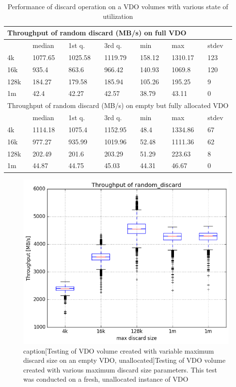 \documentclass[
  color, %
  table, %
  lof,   %
  lot,   %
]{fithesis3}
\begin{document}
\begin{table}
\centering
\begin{tabular}{|l|l|l|l|l|l|l|}
        \hline
        \multicolumn{7}{|l|}{Throughput of random discard (MB/s) on full VDO} \\ \hline
         & median & 1st q. & 3rd q. & min & max & stdev \\ \hline 
4k & 1077.65 & 1025.58 & 1119.79 & 158.12 & 1310.17 & 123 \\ \hline
16k & 935.4 & 863.6 & 966.42 & 140.93 & 1069.8 & 120 \\ \hline
128k & 184.27 & 179.58 & 185.94 & 105.26 & 195.25 & 9 \\ \hline
1m & 42.4 & 42.27 & 42.57 & 38.79 & 43.11 & 0 \\ \hline
\hline
        \multicolumn{7}{|l|}{Throughput of random discard (MB/s) on empty but fully allocated VDO} \\ \hline
        & median & 1st q. & 3rd q. & min & max & stdev \\ \hline 
4k & 1114.18 & 1075.4 & 1152.95 & 48.4 & 1334.86 & 67 \\ \hline
16k & 977.27 & 935.99 & 1019.96 & 52.48 & 1111.36 & 62 \\ \hline
128k & 202.49 & 201.6 & 203.29 & 51.29 & 223.63 & 8 \\ \hline
1m & 44.87 & 44.75 & 45.03 & 44.31 & 46.67 & 0 \\ \hline
\end{tabular}
\caption{Performance of discard operation on a VDO volumes with various state of utilization}
\end{table}


\begin{figure}[!htb]
        \centering
\includegraphics[width=\textwidth]{../results/discards/unalloc_VDO/report/random_discard1_compare_boxplots}
caption[Testing of VDO volume created with variable maximum discard size on an empty VDO, unallocated]{Testing of VDO volume created with various maximum discard size parameters. This test was conducted on a fresh, unallocated instance of VDO}
\label{fig:discard-unalloc}
\end{figure}
\end{document}
